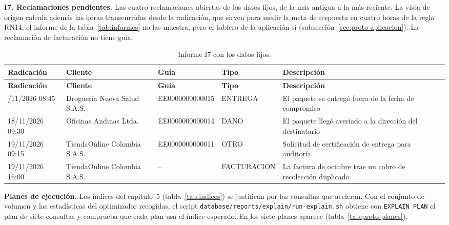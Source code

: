 \textbf{I7. Reclamaciones pendientes.} Las cuatro reclamaciones abiertas
de los datos fijos, de la más antigua a la más reciente. La vista de
origen calcula además las horas transcurridas desde la radicación, que
sirven para medir la meta de respuesta en cuatro horas de la
regla RN14; el informe de la tabla~\ref{tab:informes} no las muestra, pero
el tablero de la aplicación sí (subsección~\ref{sec:proto-aplicacion}). La
reclamación de facturación no tiene guía.

{\singlespacing\footnotesize
\begin{longtable}{L{2.3cm} L{3.0cm} L{2.6cm} L{2.5cm} L{3.0cm}}
\caption{Informe I7 con los datos fijos.}
\label{tab:proto-i7}\\
\toprule
\textbf{Radicación} & \textbf{Cliente} & \textbf{Guía} & \textbf{Tipo} & \textbf{Descripción} \\
\midrule
\endfirsthead
\toprule
\textbf{Radicación} & \textbf{Cliente} & \textbf{Guía} & \textbf{Tipo} & \textbf{Descripción} \\
\midrule
\endhead
\bottomrule
{}/11/2026 08:45 & Droguería Nueva Salud S.A.S. & EE0000000000015 & ENTREGA & El paquete se entregó fuera de la fecha de compromiso \\
18/11/2026 09:30 & Oficinas Andinas Ltda. & EE0000000000014 & DANO & El paquete llegó averiado a la dirección del destinatario \\
19/11/2026 09:15 & TiendaOnline Colombia S.A.S. & EE0000000000011 & OTRO & Solicitud de certificación de entrega para auditoría \\
19/11/2026 16:00 & TiendaOnline Colombia S.A.S. & -- & FACTURACION & La factura de octubre trae un cobro de recolección duplicado \\
\end{longtable}
\par}

\textbf{Planes de ejecución.} Los índices del capítulo~5
(tabla~\ref{tab:indices}) se justifican por las consultas que aceleran. Con
el conjunto de volumen y las estadísticas del optimizador recogidas, el
script \texttt{database/reports/explain/run-explain.sh} obtiene con
\texttt{EXPLAIN PLAN} el plan de siete consultas y comprueba que cada plan
usa el índice esperado. En los siete planes aparece
(tabla~\ref{tab:proto-planes}).

